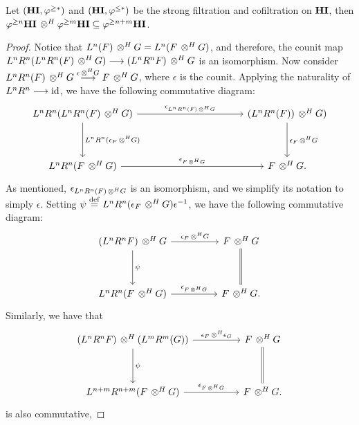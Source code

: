 \begin{prop}\label{prop_tensor_and_tfilt}
Let $(\mathbf{HI}, \varphi^{\geq *})$ and $(\mathbf{HI}, \varphi^{\leq *})$ be the strong 
filtration and cofiltration on $\mathbf{HI}$, then $\varphi^{\geq n}\mathbf{HI} \,\otimes^H 
\varphi^{\geq m}\mathbf{HI} \subseteq \varphi^{\geq n + m}\mathbf{HI}$.
\end{prop}
\begin{proof}
Notice that $L^n(F) \,\otimes^H G = L^n(F \,\otimes^H G)$, and therefore, the
counit map $L^nR^n (L^nR^n(F) \,\otimes^H G) \longrightarrow (L^nR^nF) \,\otimes^H G$ is an 
isomorphism. Now consider $L^nR^n(F) \,\otimes^H G 
\stackrel{\epsilon \,\otimes^H G}{\longrightarrow} F \,\otimes^H G$, where $\epsilon$ is the 
counit. Applying the naturality of $L^nR^n \longrightarrow \mathrm{id}$, we have the 
following commutative diagram:
\[
\begin{tikzcd}[column sep=11em, row sep=huge]
L^nR^n(L^nR^n(F) \tHI G) \arrow{r}{\epsilon_{L^nR^n(F)\tHI G}}
   \arrow{d}{L^nR^n(\epsilon_F \tHI G) }&
(L^nR^n(F)) \tHI G) \arrow{d}{\epsilon_F \tHI G} \\
L^nR^n(F \tHI G) \arrow{r}{\epsilon_{F \tHI G}} &
F \tHI G.
\end{tikzcd}
\]
As mentioned, $\epsilon_{L^nR^n(F) \,\otimes^H G}$ is an isomorphism, and
we simplify its notation to simply $\epsilon$. Setting $\psi 
\stackrel{\mathrm{def}}{=} L^nR^n(\epsilon_F \,\otimes^H G) \epsilon^{-1}$, we have the 
following commutative diagram:
\[
\begin{tikzcd}[column sep=huge, row sep=huge]
(L^nR^n F) \tHI G \arrow{r}{\epsilon_F \tHI G} \arrow{d}{\psi} &
F \tHI G \arrow[equals]{d} \\
L^nR^n(F \tHI G) \arrow{r}{\epsilon_{F \tHI G}} &
F \tHI G.
\end{tikzcd}
\]
Similarly, we have that
\[
\begin{tikzcd}[column sep=huge, row sep=huge]
(L^nR^n F) \tHI (L^mR^m(G)) \arrow{r}{\epsilon_F \tHI \epsilon_G} 
   \arrow{d}{\psi} &
F \tHI G \arrow[equals]{d} \\
L^{n + m}R^{n + m}(F \tHI G) \arrow{r}{\epsilon_{F \tHI G}} &
F \tHI G.
\end{tikzcd}
\]
is also commutative,
\end{proof}
